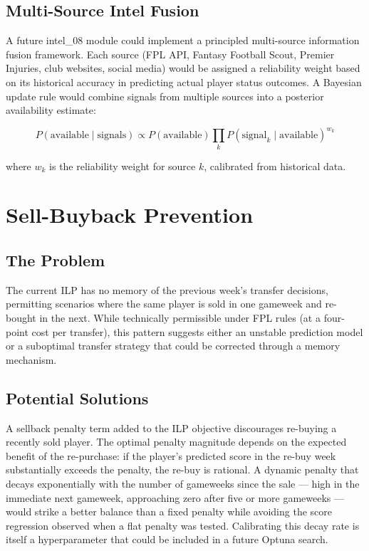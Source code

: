 \subsection{Multi-Source Intel Fusion}

A future intel\_08 module could implement a principled multi-source information fusion framework. Each source (FPL API, Fantasy Football Scout, Premier Injuries, club websites, social media) would be assigned a reliability weight based on its historical accuracy in predicting actual player status outcomes. A Bayesian update rule would combine signals from multiple sources into a posterior availability estimate:

\begin{equation}
P(\text{available} \mid \text{signals}) \propto P(\text{available}) \prod_k P(\text{signal}_k \mid \text{available})^{w_k}
\end{equation}

where $w_k$ is the reliability weight for source $k$, calibrated from historical data.

\section{Sell-Buyback Prevention}

\subsection{The Problem}

The current ILP has no memory of the previous week's transfer decisions, permitting scenarios where the same player is sold in one gameweek and re-bought in the next. While technically permissible under FPL rules (at a four-point cost per transfer), this pattern suggests either an unstable prediction model or a suboptimal transfer strategy that could be corrected through a memory mechanism.

\subsection{Potential Solutions}

A sellback penalty term added to the ILP objective discourages re-buying a recently sold player. The optimal penalty magnitude depends on the expected benefit of the re-purchase: if the player's predicted score in the re-buy week substantially exceeds the penalty, the re-buy is rational. A dynamic penalty that decays exponentially with the number of gameweeks since the sale — high in the immediate next gameweek, approaching zero after five or more gameweeks — would strike a better balance than a fixed penalty while avoiding the score regression observed when a flat penalty was tested. Calibrating this decay rate is itself a hyperparameter that could be included in a future Optuna search.
